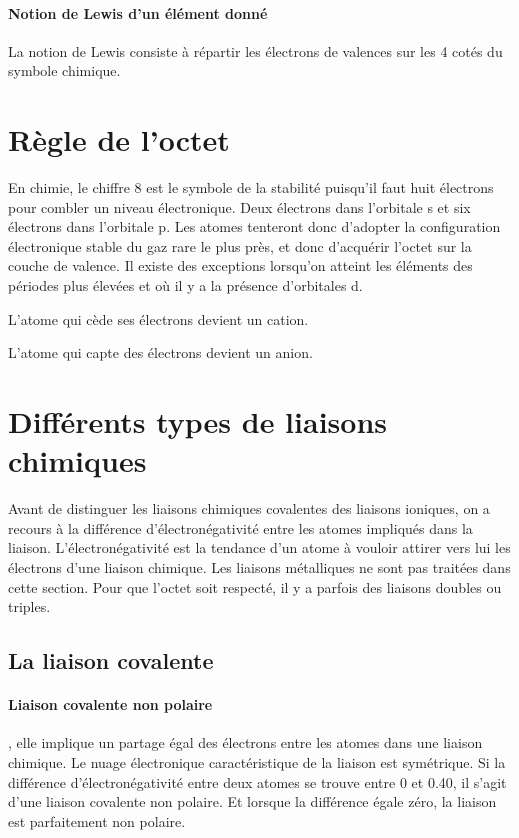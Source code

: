 \paragraph{Notion de Lewis d'un élément donné}
La notion de Lewis consiste à répartir les électrons de valences sur les 4 cotés du symbole chimique.

\section{Règle de l'octet}
En chimie, le chiffre 8 est le symbole de la stabilité puisqu'il faut huit électrons pour combler un niveau électronique.
Deux électrons dans l'orbitale s et six électrons dans l'orbitale  p.
Les atomes tenteront donc d'adopter la configuration électronique stable du gaz rare le plus près, et donc d'acquérir l'octet sur la couche de valence.
Il existe des exceptions lorsqu'on atteint les éléments des périodes plus élevées et où il y a la présence d'orbitales d.

L'atome qui cède ses électrons devient un cation.

L'atome qui capte des électrons devient un anion.


\section{Différents types de liaisons chimiques}
Avant de distinguer les liaisons chimiques covalentes des liaisons ioniques, on a recours à la différence d'électronégativité entre les atomes impliqués dans la liaison.
L'électronégativité est la tendance d'un atome à vouloir attirer vers lui les électrons d'une liaison chimique.
Les liaisons métalliques ne sont pas traitées dans cette section.
Pour que l'octet soit respecté, il y a parfois des liaisons doubles ou triples.

\subsection{La liaison covalente}

\paragraph{Liaison covalente non polaire}, elle implique un partage égal des électrons entre les atomes dans une liaison chimique.
Le nuage électronique caractéristique de la liaison est symétrique.
Si la différence d'électronégativité entre deux atomes se trouve entre 0 et 0.40, il s'agit d'une liaison covalente non polaire.
Et lorsque la différence égale zéro, la liaison est parfaitement non polaire.

